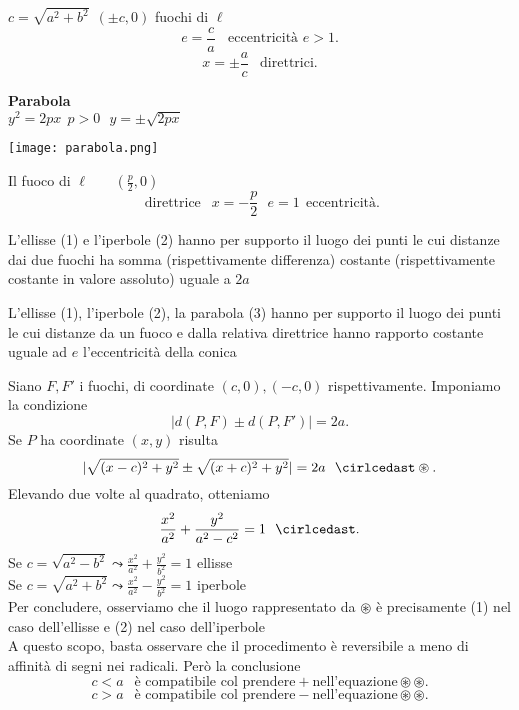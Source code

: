 \documentclass[12px]{article}
\begin{document}
  \begin{defi}
	  $c = \sqrt{a^2 + b^2} \ \ (\pm c,0)$ fuochi di $\ell$ 
	   \[
		   e = \frac c a \ \ \ \ \text{eccentricità } e>1
	  .\] 
	  \[
		  x = \pm \frac a c \ \ \text{ direttrici}
	  .\] 
  \end{defi}
  \textbf{Parabola}\\
  $y^2 = 2 px \ \ p>0\ \ \ y = \pm\sqrt{2px}$\\
\begin{center}
	\texttt{[image: parabola.png]}
\end{center}
\begin{defi}
	Il fuoco di $\ell$ \ \ \ $(\frac p 2 , 0)$
	 \[
		 \text{ direttrice } \ \ x = -\frac  p 2 \ \ \ e = 1 \ \ \text{eccentricità}
	.\] 
\end{defi}
\begin{prop}
	L'ellisse (1) e l'iperbole (2) hanno per supporto il luogo dei punti le cui distanze dai due fuochi ha somma (rispettivamente differenza) costante (rispettivamente costante in valore assoluto) uguale a $2a$
\end{prop}
\begin{prop}
	L'ellisse (1), l'iperbole (2), la parabola (3) hanno per supporto il luogo dei punti le cui distanze da un fuoco e dalla relativa direttrice hanno rapporto costante uguale ad $e$ l'eccentricità della conica
\end{prop}
\begin{dimo}[proposizione 1]
	Siano $F, F'$ i fuochi, di coordinate $(c,0),(-c,0)$ rispettivamente.
	Imponiamo la condizione
	\[
	|d(P,F)\pm d(P,F')| = 2a
	.\] 
	Se $P$ ha  coordinate $(x,y)$ risulta \[
		|\sqrt{(x-c)^2+y^2}\pm\sqrt{(x+c)^2 + y^2}| = 2a \ \ \cirlcedast\circledast
	.\] 
	Elevando due volte al quadrato, otteniamo 
	\[
		\frac{x^2}{a^2} + \frac{y^2}{a^2-c^2} = 1 \ \ \cirlcedast
	.\] 
	Se $c = \sqrt{a^2 - b^2} \leadsto \frac{x^2}{a^2} + \frac{y^2}{b^2} =1$ ellisse\\
	Se $c = \sqrt{a^2 + b^2} \leadsto \frac{x^2}{a^2} - \frac {y^2}{b^2} = 1$ iperbole\\
	Per concludere, osserviamo che il luogo rappresentato da $\circledast$ è precisamente (1) nel caso dell'ellisse e (2) nel caso dell'iperbole\\
	A questo scopo, basta osservare che il procedimento è reversibile a meno di affinità di segni nei radicali. Però la conclusione\\
	\[
		c < a \ \ \text{ è compatibile col prendere} + \text{nell'equazione} \circledast\circledast
	.\] 
	\[
		c > a \ \ \text{ è compatibile col prendere} - \text{nell'equazione} \circledast\circledast
	.\] 
\end{dimo}
\end{document}
